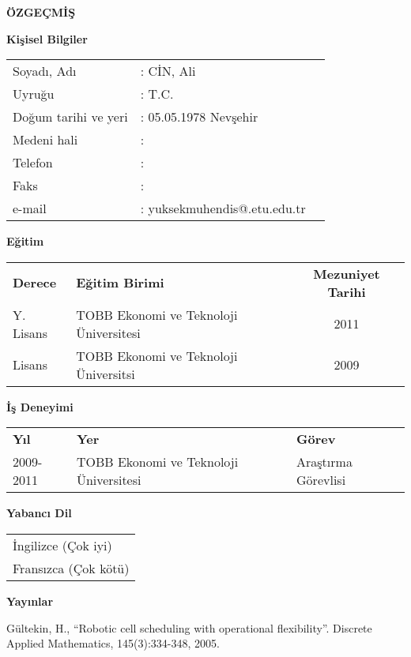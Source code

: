 \newpage
\pagestyle{plain}
\begin{center}
{\LARGE \bf \"OZGE\c{C}M\.{I}\c{S}}
\end{center}
\vspace{0.5cm}
{\bf Ki\c{s}isel Bilgiler}


\noindent
\begin{tabular}{@{}lll@{}}
Soyad{\i}, Ad{\i} & : C\.{I}N, Ali &\\
Uyru\u{g}u & : T.C.&\\
Do\u{g}um tarihi ve yeri & : 05.05.1978 Nev\c{s}ehir&\\
Medeni hali & : &\\
Telefon & : &\\
Faks & : &\\
e-mail & : yuksekmuhendis@.etu.edu.tr &\\
\end{tabular}

\vspace{0.5cm}
\noindent
{\bf E\u{g}itim}


\noindent
\begin{tabular}{@{}llc@{}}
{\bf Derece} & {\bf E\u{g}itim Birimi} & {\bf Mezuniyet Tarihi}\\
Y. Lisans & TOBB Ekonomi ve Teknoloji \"Universitesi & 2011\\
Lisans & TOBB Ekonomi ve Teknoloji \"Universitsi& 2009\\
\end{tabular}

\vspace{0.5cm}
\noindent
{\bf \.{I}\c{s} Deneyimi}


\noindent
\begin{tabular}{@{}lll@{}}
{\bf Y{\i}l} & {\bf Yer} & {\bf G\"orev}\\
2009-2011 & TOBB Ekonomi ve Teknoloji \"Universitesi & Ara\c{s}t{\i}rma G\"orevlisi\\
\end{tabular}

\vspace{0.5cm}
\noindent
{\bf Yabanc{\i} Dil}


\noindent
\begin{tabular}{@{}l@{}}
\.{I}ngilizce (\c{C}ok iyi)\\
Frans{\i}zca (\c{C}ok k\"ot\"u)\\
\end{tabular}


\vspace{0.5cm}
\noindent
{\bf Yay{\i}nlar}


\noindent
G\"ultekin, H., ``Robotic cell scheduling with operational flexibility''. Discrete Applied Mathematics, 145(3):334-348, 2005.\\
